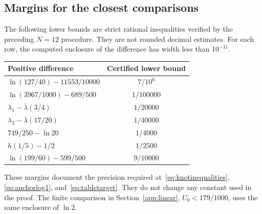 \subsection*{Margins for the closest comparisons}
The following lower bounds are strict rational inequalities verified by the preceding $N=12$ procedure. They are not rounded decimal estimates. For each row, the computed enclosure of the difference has width less than $10^{-11}$.
\begin{center}
\renewcommand{\arraystretch}{1.15}
\begin{tabular}{@{}lc@{}}
\toprule
Positive difference & Certified lower bound\\
\midrule
$\ln(127/40)-11553/10000$ & $7/10^6$\\
$\ln(3967/1000)-689/500$ & $1/100000$\\
$\lambda_1-\overline\lambda(3/4)$ & $1/20000$\\
$\lambda_2-\overline\lambda(17/20)$ & $1/40000$\\
$749/250-\ln20$ & $1/4000$\\
$h(1/5)-1/2$ & $1/2500$\\
$\ln(199/60)-599/500$ & $9/10000$\\
\bottomrule
\end{tabular}
\end{center}
These margins document the precision required at~\eqref{eq:knotinequalities}, \eqref{eq:anchorlog1}, and~\eqref{eq:tabletarget}. They do not change any constant used in the proof. The finite comparison in Section~\ref{app:linear}, $U_0<179/1000$, uses the same enclosure of $\ln2$.
